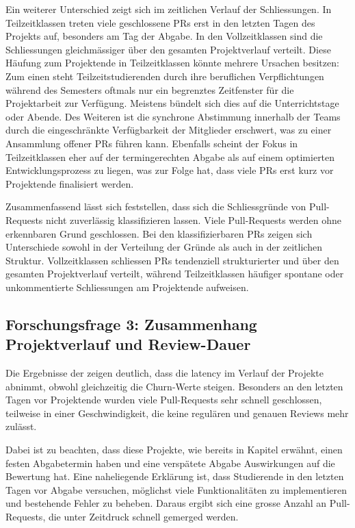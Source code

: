Ein weiterer Unterschied zeigt sich im zeitlichen Verlauf der Schliessungen. In Teilzeitklassen treten viele geschlossene PRs erst in den letzten Tagen des Projekts auf, besonders am Tag der Abgabe. In den Vollzeitklassen sind die Schliessungen gleichmässiger über den gesamten Projektverlauf verteilt.
Diese Häufung zum Projekt\-ende in Teilzeitklassen könnte mehrere Ursachen besitzen: Zum einen steht Teilzeitstudierenden durch ihre beruflichen Verpflichtungen während des Semesters oftmals nur ein begrenztes Zeitfenster für die Projektarbeit zur Verfügung. Meistens bündelt sich dies auf die Unterrichtstage oder Abende. Des Weiteren ist die synchrone Abstimmung innerhalb der Teams durch die eingeschränkte Verfügbarkeit der Mitglieder erschwert, was zu einer Ansammlung offener PRs führen kann. Ebenfalls scheint der Fokus in Teilzeitklassen eher auf der termingerechten Abgabe als auf einem optimierten Entwicklungsprozess zu liegen, was zur Folge hat, dass viele PRs erst kurz vor Projektende finalisiert werden.

Zusammenfassend lässt sich feststellen, dass sich die Schliessgründe von Pull-Re\-quests nicht zuverlässig klassifizieren lassen. Viele Pull-Requests werden ohne erkennbaren Grund geschlossen. Bei den klassifizierbaren PRs zeigen sich Unterschiede sowohl in der Verteilung der Gründe als auch in der zeitlichen Struktur. Vollzeitklassen schliessen PRs tendenziell strukturierter und über den gesamten Projektverlauf verteilt, während Teilzeitklassen häufiger spontane oder unkommentierte Schliessungen am Projektende aufweisen.


\subsection{Forschungsfrage 3: Zusammenhang Projektverlauf und Review-\linebreak Dauer}
Die Ergebnisse der  zeigen deutlich, dass die latency im Verlauf der Projekte abnimmt, obwohl gleichzeitig die Churn-Werte steigen. Besonders an den letzten Tagen vor Projektende wurden viele Pull-Requests sehr schnell geschlossen, teilweise in einer Geschwindigkeit, die keine regulären und genauen Reviews mehr zulässt. 

Dabei ist zu beachten, dass diese Projekte, wie bereits in Kapitel  erwähnt, einen festen Abgabetermin haben und eine verspätete Abgabe Auswirkungen auf die Bewertung hat. Eine naheliegende Erklärung ist, dass Studierende in den letzten Tagen vor Abgabe versuchen, möglichst viele Funktionalitäten zu implementieren und bestehende Fehler zu beheben. Daraus ergibt sich eine grosse Anzahl an Pull-Requests, die unter Zeitdruck schnell gemerged werden. 

